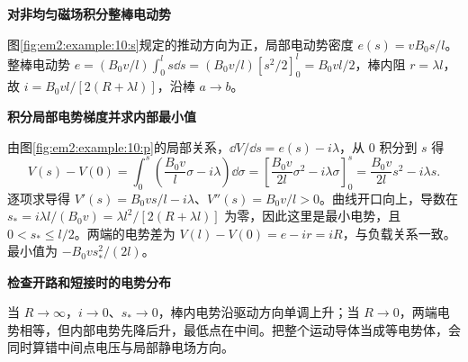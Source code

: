 \begin{solution}\textbf{对非均匀磁场积分整棒电动势}\par\nobreak
图\ref{fig:em2:example:10:s}规定的推动方向为正，局部电动势密度 $e(s)=vB_0s/l$。整棒电动势 $e=(B_0v/l)\int_0^l s\dd s=(B_0v/l)[s^2/2]_0^l=B_0vl/2$，棒内阻 $r=\lambda l$，故 $i=B_0vl/[2(R+\lambda l)]$，沿棒 $a\to b$。



\par\medskip{}\noindent\textbf{积分局部电势梯度并求内部最小值}\par\nobreak
由图\ref{fig:em2:example:10:p}的局部关系，$\dd V/\dd s=e(s)-i\lambda$，从 $0$ 积分到 $s$ 得
\[V(s)-V(0)=\int_0^s\left(\frac{B_0v}{l}\sigma-i\lambda\right)\dd\sigma
=\left[\frac{B_0v}{2l}\sigma^2-i\lambda\sigma\right]_0^s
=\frac{B_0v}{2l}s^2-i\lambda s.\]
逐项求导得 $V'(s)=B_0vs/l-i\lambda$、$V''(s)=B_0v/l>0$。曲线开口向上，导数在 $s_*=i\lambda l/(B_0v)=\lambda l^2/[2(R+\lambda l)]$ 为零，因此这里是最小电势，且 $0<s_*\le l/2$。两端的电势差为 $V(l)-V(0)=e-ir=iR$，与负载关系一致。最小值为 $-B_0vs_*^2/(2l)$。



\par\medskip{}\noindent\textbf{检查开路和短接时的电势分布}\par\nobreak
当 $R\to\infty$，$i\to0$、$s_*\to0$，棒内电势沿驱动方向单调上升；当 $R\to0$，两端电势相等，但内部电势先降后升，最低点在中间。把整个运动导体当成等电势体，会同时算错中间点电压与局部静电场方向。\end{solution}
